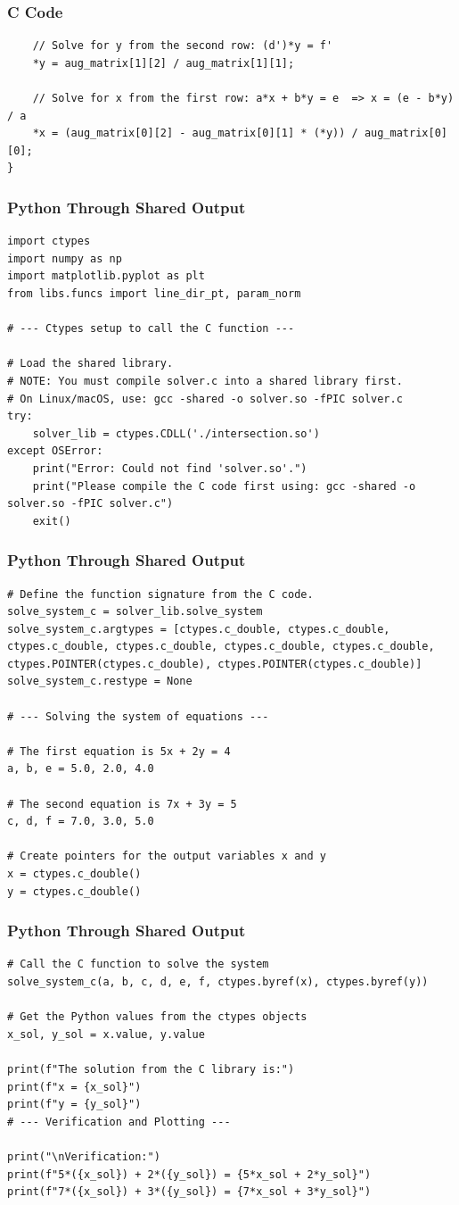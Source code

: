 \documentclass{beamer}
\begin{document}
\begin{frame}[fragile]
\frametitle{C Code}
\begin{lstlisting}
    // Solve for y from the second row: (d')*y = f'
    *y = aug_matrix[1][2] / aug_matrix[1][1];

    // Solve for x from the first row: a*x + b*y = e  => x = (e - b*y) / a
    *x = (aug_matrix[0][2] - aug_matrix[0][1] * (*y)) / aug_matrix[0][0];
}
\end{lstlisting}
\end{frame}
\begin{frame}[fragile]
\frametitle{Python Through Shared Output}
\begin{lstlisting}
import ctypes
import numpy as np
import matplotlib.pyplot as plt
from libs.funcs import line_dir_pt, param_norm

# --- Ctypes setup to call the C function ---

# Load the shared library.
# NOTE: You must compile solver.c into a shared library first.
# On Linux/macOS, use: gcc -shared -o solver.so -fPIC solver.c
try:
    solver_lib = ctypes.CDLL('./intersection.so')
except OSError:
    print("Error: Could not find 'solver.so'.")
    print("Please compile the C code first using: gcc -shared -o solver.so -fPIC solver.c")
    exit()

\end{lstlisting}
\end{frame}
\begin{frame}[fragile]
\frametitle{Python Through Shared Output}
\begin{lstlisting}
# Define the function signature from the C code.
solve_system_c = solver_lib.solve_system
solve_system_c.argtypes = [ctypes.c_double, ctypes.c_double, ctypes.c_double, ctypes.c_double, ctypes.c_double, ctypes.c_double, ctypes.POINTER(ctypes.c_double), ctypes.POINTER(ctypes.c_double)]
solve_system_c.restype = None

# --- Solving the system of equations ---

# The first equation is 5x + 2y = 4
a, b, e = 5.0, 2.0, 4.0

# The second equation is 7x + 3y = 5
c, d, f = 7.0, 3.0, 5.0

# Create pointers for the output variables x and y
x = ctypes.c_double()
y = ctypes.c_double()
\end{lstlisting}
\end{frame}
\begin{frame}[fragile]
\frametitle{Python Through Shared Output}
\begin{lstlisting}
# Call the C function to solve the system
solve_system_c(a, b, c, d, e, f, ctypes.byref(x), ctypes.byref(y))

# Get the Python values from the ctypes objects
x_sol, y_sol = x.value, y.value

print(f"The solution from the C library is:")
print(f"x = {x_sol}")
print(f"y = {y_sol}")
# --- Verification and Plotting ---

print("\nVerification:")
print(f"5*({x_sol}) + 2*({y_sol}) = {5*x_sol + 2*y_sol}")
print(f"7*({x_sol}) + 3*({y_sol}) = {7*x_sol + 3*y_sol}")
\end{lstlisting}
\end{frame}
\end{document}
